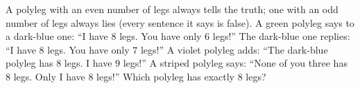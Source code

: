 A polyleg with an even number of legs always tells the truth; one with an odd number of legs always lies (every sentence it says is false). A green polyleg says to a dark-blue one: ``I have $8$ legs. You have only $6$ legs!'' The dark-blue one replies: ``I have $8$ legs. You have only $7$ legs!'' A violet polyleg adds: ``The dark-blue polyleg has $8$ legs. I have $9$ legs!'' A striped polyleg says: ``None of you three has $8$ legs. Only I have $8$ legs!'' Which polyleg has exactly $8$ legs?
